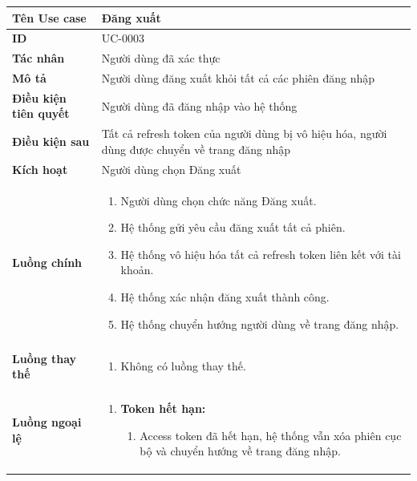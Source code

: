 {
\small
\renewcommand{\arraystretch}{1.15}

\begin{tabularx}{\textwidth}{|>{\raggedright\arraybackslash}p{3.5cm}|>{\raggedright\arraybackslash}X|}
\hline
\textbf{Tên Use case} & Đăng xuất \\
\hline
\textbf{ID} & UC-0003 \\
\hline
\textbf{Tác nhân} & Người dùng đã xác thực \\
\hline
\textbf{Mô tả} & Người dùng đăng xuất khỏi tất cả các phiên đăng nhập \\
\hline
\textbf{Điều kiện tiên quyết} & Người dùng đã đăng nhập vào hệ thống \\
\hline
\textbf{Điều kiện sau} & Tất cả refresh token của người dùng bị vô hiệu hóa, người dùng được chuyển về trang đăng nhập \\
\hline
\textbf{Kích hoạt} & Người dùng chọn Đăng xuất \\
\hline
\textbf{Luồng chính} &
\begin{enumerate}
    \item Người dùng chọn chức năng Đăng xuất.
    \item Hệ thống gửi yêu cầu đăng xuất tất cả phiên.
    \item Hệ thống vô hiệu hóa tất cả refresh token liên kết với tài khoản.
    \item Hệ thống xác nhận đăng xuất thành công.
    \item Hệ thống chuyển hướng người dùng về trang đăng nhập.
\end{enumerate} \\
\hline
\textbf{Luồng thay thế} &
\begin{enumerate}
    \item Không có luồng thay thế.
\end{enumerate} \\
\hline
\textbf{Luồng ngoại lệ} &
\begin{enumerate}
    \item \textbf{Token hết hạn:}
    \begin{enumerate}
        \item[2Err.] Access token đã hết hạn, hệ thống vẫn xóa phiên cục bộ và chuyển hướng về trang đăng nhập.
    \end{enumerate}
\end{enumerate} \\
\hline
\end{tabularx}
}

